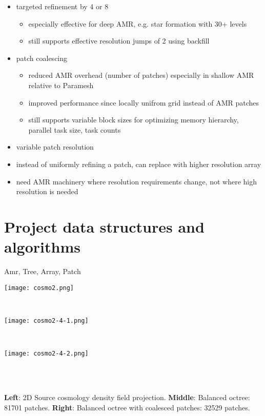 \documentclass[14pt]{article}
\begin{document}
\begin{itemize}
\item targeted refinement by 4 or 8
  \begin{itemize}
  \item especially effective for deep AMR, e.g. star formation with
    30+ levels
  \item still supports effective resolution jumps of 2 using backfill
  \end{itemize}
\item patch coalescing
  \begin{itemize}
  \item reduced AMR overhead (number of patches) especially in shallow
    AMR relative to Paramesh
  \item improved performance since locally unifrom grid instead of AMR
    patches
  \item still supports variable block sizes for optimizing memory
    hierarchy, parallel task size, task counts
  \end{itemize}
\item variable patch resolution
\item instead of uniformly refining a patch, can replace with higher
  resolution array
\item need AMR machinery where resolution requirements change, not
  where high resolution is needed
\end{itemize}


\section{Project data structures and algorithms}

Amr, Tree, Array, Patch

\begin{center}
\begin{minipage}{7.0in}
\begin{minipage}{2.2in}
\texttt{[image: cosmo2.png]}
\end{minipage} \ 
\begin{minipage}{2.2in}
\texttt{[image: cosmo2-4-1.png]}
\end{minipage} \ 
\begin{minipage}{2.2in}
\texttt{[image: cosmo2-4-2.png]}
\end{minipage}
\end{minipage} \\
\ \\
\begin{minipage}{7in}
\textbf{Left}: 2D Source cosmology density field projection.  
\textbf{Middle}: Balanced octree: 81701 patches.
\textbf{Right}: Balanced octree with coalesced patches: 32529 patches.
\ \\
\end{minipage}
\end{center}
\end{document}
